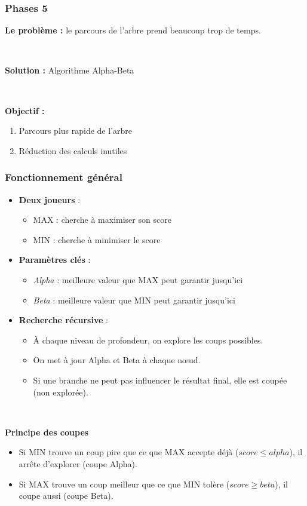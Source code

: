 \documentclass[9pt]{beamer}
\begin{document}
\begin{frame}
  \frametitle{Phases 5}
  \textbf{Le problème :} le parcours de l'arbre prend beaucoup trop de temps.

  ~

\textbf{Solution :} Algorithme Alpha-Beta

~

\textbf{Objectif :} 
\begin{enumerate}
  \item Parcours plus rapide de l'arbre
  \item Réduction des calculs inutiles
\end{enumerate}
\end{frame}

\begin{frame}
  \frametitle{Fonctionnement général}
  \begin{itemize}
    \item \textbf{Deux joueurs }: 
    \begin{itemize}
      \item MAX : cherche à maximiser son score
      \item MIN : cherche à minimiser le score
    \end{itemize}
    \item \textbf{Paramètres clés} :
    \begin{itemize}
      \item \textit{Alpha} : meilleure valeur que MAX peut garantir jusqu’ici
      \item \textit{Beta} : meilleure valeur que MIN peut garantir jusqu’ici
    \end{itemize}
    \item \textbf{Recherche récursive} :
    \begin{itemize}
      \item À chaque niveau de profondeur, on explore les coups possibles.
      \item On met à jour Alpha et Beta à chaque nœud.
      \item Si une branche ne peut pas influencer le résultat final, elle est coupée (non explorée).
    \end{itemize}
  \end{itemize}

  ~


  \textbf{Principe des coupes }
  \begin{itemize}
    \item Si MIN trouve un coup pire que ce que MAX accepte déjà (\textit{$score \leq alpha$}), il arrête d'explorer (coupe Alpha).
    \item Si MAX trouve un coup meilleur que ce que MIN tolère (\textit{$score \geq beta$}), il coupe aussi (coupe Beta).
  \end{itemize}
\end{frame}
\end{document}
